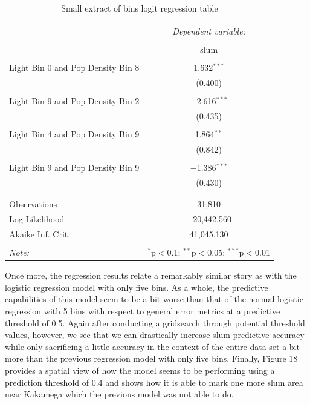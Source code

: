 \begin{table}[!htbp] \centering 
  \caption{Small extract of bins logit regression table} 
  \label{Bins Regression Table} 
\begin{tabular}{@{\extracolsep{5pt}}lc} 
\\[-1.8ex]\hline 
\hline \\[-1.8ex] 
 & \multicolumn{1}{c}{\textit{Dependent variable:}} \\ 
\cline{2-2} 
\\[-1.8ex] & slum \\ 
\hline \\[-1.8ex] 
Light Bin 0 and Pop Density Bin 8 & 1.632$^{***}$ \\ 
  & (0.400) \\ 
  & \\ 
 Light Bin 9 and Pop Density Bin 2 & $-$2.616$^{***}$ \\ 
  & (0.435) \\ 
  & \\ 
 Light Bin 4 and Pop Density Bin 9 & 1.864$^{**}$ \\ 
  & (0.842) \\ 
  & \\ 
 Light Bin 9 and Pop Density Bin 9 & $-$1.386$^{***}$ \\ 
  & (0.430) \\ 
  & \\ 
\hline \\[-1.8ex] 
Observations & 31,810 \\ 
Log Likelihood & $-$20,442.560 \\ 
Akaike Inf. Crit. & 41,045.130 \\ 
\hline 
\hline \\[-1.8ex] 
\textit{Note:}  & \multicolumn{1}{r}{$^{*}$p$<$0.1; $^{**}$p$<$0.05; $^{***}$p$<$0.01} \\ 
\end{tabular} 
\end{table} 


Once more, the regression results relate a remarkably similar story as with the logistic regression model with only five bins. As a whole, the predictive capabilities of this model seem to be a bit worse than that of the normal logistic regression with 5 bins with respect to general error metrics at a predictive threshold of 0.5. Again after conducting a gridsearch through potential threshold values, however, we see that we can drastically increase slum predictive accuracy while only sacrificing a little accuracy in the context of the entire data set a bit more than the previous regression model with only five bins. Finally, Figure 18 provides a spatial view of how the model seems to be performing using a prediction threshold of 0.4 and shows how it is able to mark one more slum area near Kakamega which the previous model was not able to do.

